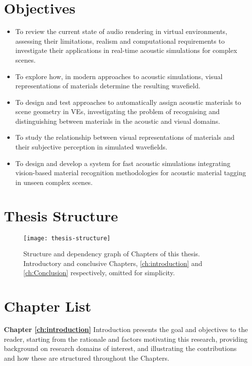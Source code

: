 \section{Objectives}
\begin{itemize}
    \item To review the current state of audio rendering in virtual environments, assessing their limitations, realism and computational requirements to investigate their applications in real-time acoustic simulations for complex scenes.
    \item To explore how, in modern approaches to acoustic simulations, visual representations of materials determine the resulting wavefield.
    \item To design and test approaches to automatically assign acoustic materials to scene geometry in VEs, investigating the problem of recognising and distinguishing between materials in the acoustic and visual domains.
    \item To study the relationship between visual representations of materials and their subjective perception in simulated wavefields.
    \item To design and develop a system for fast acoustic simulations integrating vision-based material recognition methodologies for acoustic material tagging in unseen complex scenes.
\end{itemize}

\section{Thesis Structure}

\begin{figure}[htbp]
    \centering
    \texttt{[image: thesis-structure]}
    \caption{Structure and dependency graph of Chapters of this thesis. Introductory and conclusive Chapters, \ref{ch:introduction} and \ref{ch:Conclusion} respectively, omitted for simplicity.}
    \label{fig:thesis-structure}
\end{figure}

\section{Chapter List}
\textbf{Chapter \ref{ch:introduction}} Introduction presents the goal and objectives to the reader, starting from the rationale and factors motivating this research, providing background on research domains of interest, and illustrating the contributions and how these are structured throughout the Chapters.


